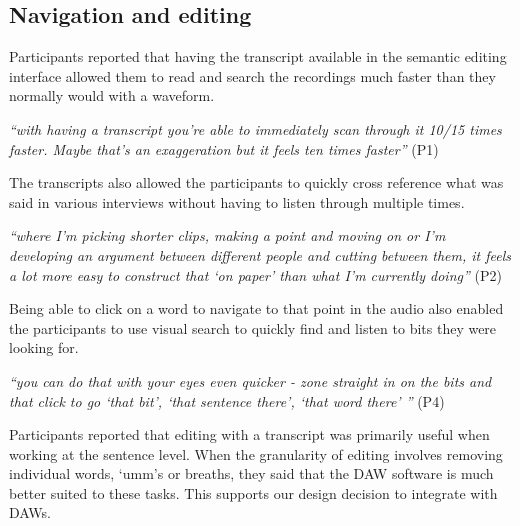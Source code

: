 


\subsection{Navigation and editing}
Participants reported that having the transcript available in the semantic
editing interface allowed them to read and search the recordings much faster
than they normally would with a waveform.

\textit{``with having a transcript you're able to immediately scan through it
  10/15 times faster. Maybe that's an exaggeration but it feels ten times
  faster''} (P1)

The transcripts also allowed the participants to quickly cross reference what
was said in various interviews without having to listen through multiple times.

\textit{``where I'm picking shorter clips, making a point and moving on or I'm
  developing an argument between different people and cutting between them, it
  feels a lot more easy to construct that `on paper' than what I'm currently
  doing''} (P2)


Being able to click on a word to navigate to that point in the audio also
enabled the participants to use visual search to quickly find and listen to
bits they were looking for.

\textit{``you can do that with your eyes even quicker - zone straight in on the
  bits and that click to go  `that bit', `that sentence there', `that word
  there' ''} (P4)

Participants reported that editing with a transcript was primarily useful when
working at the sentence level. When the granularity of editing involves
removing individual words, `umm's or breaths, they said that the DAW software
is much better suited to these tasks. This supports our design decision to
integrate with DAWs.

